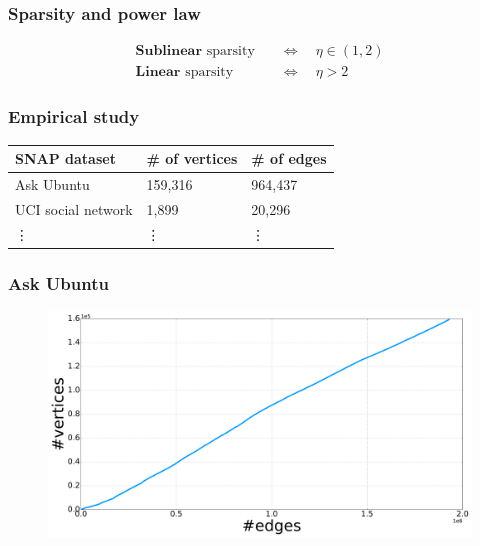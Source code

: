 \documentclass[final,hyperref={pdfpagelabels=false},noamsthm]{beamer}
\begin{document}
\begin{frame}
	\frametitle{Sparsity and power law}
	\begin{align*}
	\textbf{Sublinear } \text{sparsity} & \quad \iff \quad  \eta \in (1,2) \\
	\textbf{Linear } \text{sparsity} & \quad \iff \quad \eta > 2
	\end{align*}
\end{frame}

\begin{frame}
	\frametitle{Empirical study}
	\begin{table}[b]
		\label{tab:datasets}
		\begin{center}
			\begin{tabular}{lll}
				SNAP dataset \cite{snapnets} & \# of vertices   & \# of edges    \\
				\hline
				Ask Ubuntu    & 159,316   & 964,437    \\
				UCI social network   & 1,899     & 20,296     \\
				\vdots & \vdots & \vdots
			\end{tabular}
		\end{center}
	\end{table}
	
\end{frame}

\begin{frame}
	\frametitle{Ask Ubuntu}
	\begin{figure}[h]
		\includegraphics[width=1.0\textwidth]{fig/n_askubuntu_arrival.pdf}
	\end{figure}
\end{frame}
\end{document}
